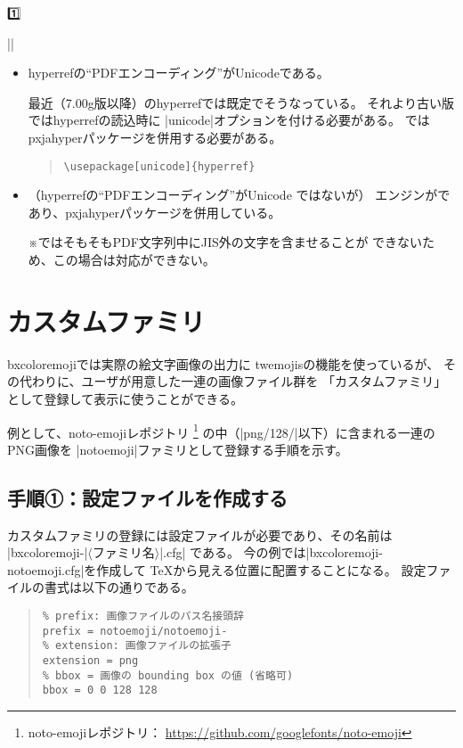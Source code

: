 \documentclass[a4paper]{ltjsarticle}
\renewcommand{\headfont}{\romanseries{sbc}\sffamily}
\newcommand{\CE}[1]{\coloremoji{#1}}
\newcommand{\Pkg}[1]{\textsf{#1}}
\newcommand{\Meta}[1]{$\langle$\mbox{}#1\mbox{}$\rangle$}
\newcommand{\Note}{\par\noindent ※}
\newcommand{\Means}{：\quad}
\newcommand{\／}{\mbox{}／\mbox{}}
\newcommand{\EG}{\eghostguarded}
\providecommand{\Strong}[1]{{\headfont#1}}
\begin{document}
\begin{coloremojiautolist}{1️⃣}
\begin{coloremojiautolist}{|\CE{♠}|}
\begin{itemize}
\item \Pkg{hyperref}の“PDFエンコーディング”がUnicodeである。

  最近（7.00g版以降）の\Pkg{hyperref}では既定でそうなっている。
  それより古い版では\Pkg{hyperref}の読込時に
  |unicode|オプションを付ける必要がある。
  \EG{(u)\pLaTeX}では\Pkg{pxjahyper}パッケージを併用する必要がある。
\begin{quote}\small\begin{verbatim}
\usepackage[unicode]{hyperref}
\end{verbatim}\end{quote}

\item （\Pkg{hyperref}の“PDFエンコーディング”がUnicode ではないが）
  エンジンが{\upLaTeX}であり、\Pkg{pxjahyper}パッケージを併用している。
  \Note {\pLaTeX}ではそもそもPDF文字列中にJIS外の文字を含ませることが
  できないため、この場合は対応ができない。
\end{itemize}


\section{カスタムファミリ}
\label{sec:Custom-Families}

\Pkg{bxcoloremoji}では実際の絵文字画像の出力に
\Pkg{twemojis}の機能を使っているが、
その代わりに、ユーザが用意した一連の画像ファイル群を
「\Strong{カスタムファミリ}」として登録して表示に使うことができる。

例として、noto-emojiレポジトリ
\footnote{noto-emojiレポジトリ\Means
  \url{https://github.com/googlefonts/noto-emoji}}%
の中（|png/128/|以下）に含まれる一連のPNG画像を
|notoemoji|ファミリとして登録する手順を示す。

\subsection{手順①：設定ファイルを作成する}

カスタムファミリの登録には設定ファイルが必要であり、その名前は
|bxcoloremoji-|\Meta{ファミリ名}|.cfg|%
である。
今の例では|bxcoloremoji-notoemoji.cfg|を作成して
{\TeX}から見える位置に配置することになる。
設定ファイルの書式は以下の通りである。

\begin{quote}\small\begin{verbatim}
% prefix: 画像ファイルのパス名接頭辞
prefix = notoemoji/notoemoji-
% extension: 画像ファイルの拡張子
extension = png
% bbox = 画像の bounding box の値 (省略可)
bbox = 0 0 128 128
\end{verbatim}\end{quote}


\end{coloremojiautolist}
\end{coloremojiautolist}
\end{document}
